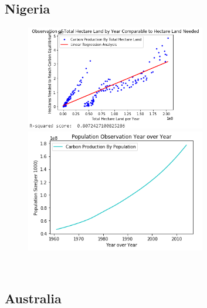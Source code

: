 \documentclass[journal,onecolumn]{IEEEtran}
\begin{document}
\newpage

\subsection{\centering Nigeria}
     
     \begin{figure}[h]
	\centering
  	\includegraphics[width=0.7\textwidth]{img/Nigeria-Carbon.png}
  	  	\includegraphics[width=0.7\textwidth]{img/Nigeria-Population.png}
\end{figure}\\

\newpage

\subsection{\centering Australia}
     
\end{document}
